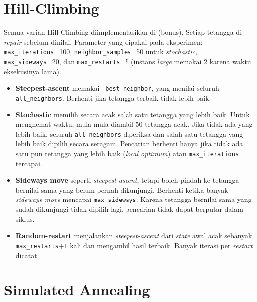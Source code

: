 \section{Hill-Climbing}

Semua varian Hill-Climbing diimplementasikan di 
(bonus). Setiap tetangga di-\textit{repair} sebelum dinilai. Parameter yang dipakai
pada eksperimen: \texttt{max\_iterations}=100, \texttt{neighbor\_samples}=50 untuk
\textit{stochastic}, \texttt{max\_sideways}=20, dan \texttt{max\_restarts}=5 (instans
\textit{large} memakai 2 karena waktu eksekusinya lama).

\begin{itemize}
	\item \textbf{Steepest-ascent} memakai \texttt{\_best\_neighbor}, yang menilai seluruh
	\texttt{all\_neighbors}. Berhenti jika tetangga terbaik tidak lebih baik.
	\item \textbf{Stochastic} memilih secara acak salah satu tetangga yang lebih baik.
	Untuk menghemat waktu, mula-mula diambil 50 tetangga acak. Jika tidak ada yang lebih
	baik, seluruh \texttt{all\_neighbors} diperiksa dan salah satu tetangga yang lebih baik
	dipilih secara seragam. Pencarian berhenti hanya jika tidak ada satu pun tetangga yang
	lebih baik (\textit{local optimum}) atau \texttt{max\_iterations} tercapai.
	\item \textbf{Sideways move} seperti \textit{steepest-ascent}, tetapi boleh pindah ke
	tetangga bernilai sama yang belum pernah dikunjungi. Berhenti ketika banyak
	\textit{sideways move} mencapai \texttt{max\_sideways}. Karena tetangga bernilai sama
	yang sudah dikunjungi tidak dipilih lagi, pencarian tidak dapat berputar dalam siklus.
	\item \textbf{Random-restart} menjalankan \textit{steepest-ascent} dari \textit{state}
	awal acak sebanyak \texttt{max\_restarts}$+1$ kali dan mengambil hasil terbaik.
	Banyak iterasi per \textit{restart} dicatat.
\end{itemize}



\section{Simulated Annealing}

